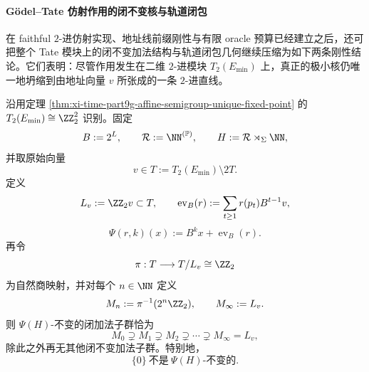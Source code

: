 \paragraph{Gödel--Tate 仿射作用的闭不变核与轨道闭包}
在 faithful \(2\)-进仿射实现、地址线前缀刚性与有限 oracle 预算已经建立之后，还可把整个 Tate 模块上的闭不变加法结构与轨道闭包几何继续压缩为如下两条刚性结论。它们表明：尽管作用发生在二维 \(2\)-进模块 \(T_2(E_{\min})\) 上，真正的极小核仍唯一地坍缩到由地址向量 \(v\) 所张成的一条 \(2\)-进直线。

\begin{theorem}\label{thm:xi-godel-tate-affine-closed-subgroup-classification}
沿用定理 \ref{thm:xi-time-part9g-affine-semigroup-unique-fixed-point} 的 \(T_2(E_{\min})\cong \ZZ_2^2\) 识别。固定
\[
B:=2^L,
\qquad
\mathcal R:=\NN^{(\mathbb P)},
\qquad
H:=\mathcal R\rtimes_\Sigma \NN,
\]
并取原始向量
\[
v\in T:=T_2(E_{\min})\setminus 2T.
\]
定义
\[
L_v:=\ZZ_2v\subset T,
\qquad
\operatorname{ev}_B(r):=\sum_{t\ge 1}r(p_t)B^{t-1}v,
\]
\[
\Psi(r,k)(x):=B^k x+\operatorname{ev}_B(r).
\]
再令
\[
\pi:T\longrightarrow T/L_v\cong \ZZ_2
\]
为自然商映射，并对每个 \(n\in\NN\) 定义
\[
M_n:=\pi^{-1}(2^n\ZZ_2),
\qquad
M_\infty:=L_v.
\]
则 \(\Psi(H)\)-不变的闭加法子群恰为
\[
\boxed{\;
M_0\supsetneq M_1\supsetneq M_2\supsetneq \cdots \supsetneq M_\infty=L_v,\;}
\]
除此之外再无其他闭不变加法子群。特别地，
\[
\boxed{\;\{0\}\ \text{不是}\ \Psi(H)\text{-不变的}.\;}
\]
\end{theorem}
